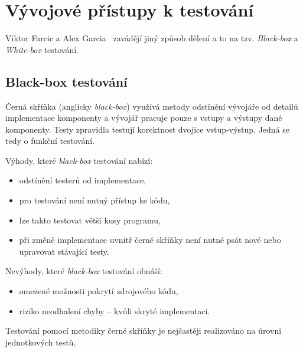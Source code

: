 \section{Vývojové přístupy k testování}
Viktor Farcic a Alex Garcia~\cite{TestDrivenJavaDevelopment} zavádějí jiný způsob dělení a to na tzv. \textit{Black-box} a \textit{White-box} testování.
\subsection{Black-box testování}
Černá skříňka (anglicky \textit{black-box}) využívá metody odstínění vývojáře od detailů implementace komponenty a vývojář pracuje pouze s vstupy a výstupy dané komponenty. Testy zpravidla testují korektnost dvojice vstup-výstup. Jedná se tedy o funkční testování.

Výhody, které \textit{black-box} testování nabízí:
\begin{itemize}
    \item odstínění testerů od implementace,
    \item pro testování není nutný přístup ke kódu,
    \item lze takto testovat větší kusy programu,
    \item při změně implementace uvnitř černé skříňky není nutné psát nové nebo upravovat stávající testy.
\end{itemize}
Nevýhody, které \textit{black-box} testování obnáší:
\begin{itemize}
    \item omezené možnosti pokrytí zdrojového kódu,
    \item riziko neodhalení chyby -- kvůli skryté implementaci.
\end{itemize}
Testování pomocí metodiky černé skříňky je nejčastěji realizováno na úrovni jednotkových testů.

